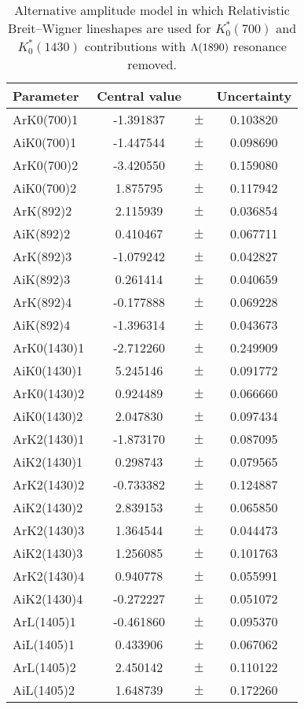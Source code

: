 \begin{table}
\centering
\caption{Alternative amplitude model in which Relativistic Breit--Wigner lineshapes are used for $K^*_0(700)$ and $K^*_0(1430)$ contributions with ${\Lambda}(1890)$ resonance removed.}
\begin{tiny}
\begin{tabular}{lccc}
\toprule
Parameter & Central value & & Uncertainty\\
\midrule
ArK0(700)1 & -1.391837 & $\pm$ & 0.103820 \\
AiK0(700)1 & -1.447544 & $\pm$ & 0.098690 \\
ArK0(700)2 & -3.420550 & $\pm$ & 0.159080 \\
AiK0(700)2 & 1.875795 & $\pm$ & 0.117942 \\
ArK(892)2 & 2.115939 & $\pm$ & 0.036854 \\
AiK(892)2 & 0.410467 & $\pm$ & 0.067711 \\
ArK(892)3 & -1.079242 & $\pm$ & 0.042827 \\
AiK(892)3 & 0.261414 & $\pm$ & 0.040659 \\
ArK(892)4 & -0.177888 & $\pm$ & 0.069228 \\
AiK(892)4 & -1.396314 & $\pm$ & 0.043673 \\
ArK0(1430)1 & -2.712260 & $\pm$ & 0.249909 \\
AiK0(1430)1 & 5.245146 & $\pm$ & 0.091772 \\
ArK0(1430)2 & 0.924489 & $\pm$ & 0.066660 \\
AiK0(1430)2 & 2.047830 & $\pm$ & 0.097434 \\
ArK2(1430)1 & -1.873170 & $\pm$ & 0.087095 \\
AiK2(1430)1 & 0.298743 & $\pm$ & 0.079565 \\
ArK2(1430)2 & -0.733382 & $\pm$ & 0.124887 \\
AiK2(1430)2 & 2.839153 & $\pm$ & 0.065850 \\
ArK2(1430)3 & 1.364544 & $\pm$ & 0.044473 \\
AiK2(1430)3 & 1.256085 & $\pm$ & 0.101763 \\
ArK2(1430)4 & 0.940778 & $\pm$ & 0.055991 \\
AiK2(1430)4 & -0.272227 & $\pm$ & 0.051072 \\
ArL(1405)1 & -0.461860 & $\pm$ & 0.095370 \\
AiL(1405)1 & 0.433906 & $\pm$ & 0.067062 \\
ArL(1405)2 & 2.450142 & $\pm$ & 0.110122 \\
AiL(1405)2 & 1.648739 & $\pm$ & 0.172260 \\

\end{tabular}
\end{tiny}
\end{table}
